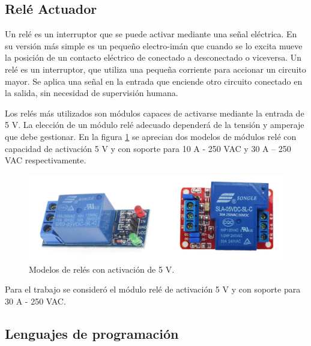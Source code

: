



\subsection{Relé Actuador}

Un relé es un interruptor que se puede activar mediante una señal eléctrica. En su versión más simple es un pequeño electro-imán que cuando se lo excita mueve la posición de un contacto eléctrico de conectado a desconectado o viceversa. Un relé es un interruptor, que utiliza una pequeña corriente para accionar un circuito mayor. Se aplica una señal en la entrada que enciende otro circuito conectado en la salida, sin necesidad de supervisión humana.

Los relés más utilizados son módulos capaces de activarse mediante la entrada de 5 V. La elección de un módulo relé adecuado dependerá de la tensión y amperaje que debe gestionar. En la figura \ref{fig:rele} se aprecian dos modelos de módulos relé con capacidad de activación 5 V y con soporte para 10 A - 250 VAC y 30 A – 250 VAC respectivamente.


\begin{figure}[htbp]
	\centering
	\includegraphics[width=1.0\textwidth]{./Figures/rele.jpg}
	\caption{Modelos de relés con activación de 5 V.}

	\label{fig:rele}
\end{figure}


Para el trabajo se consideró el módulo relé de activación 5 V y con soporte para 30 A - 250 VAC.

\subsection{Lenguajes de programación}

